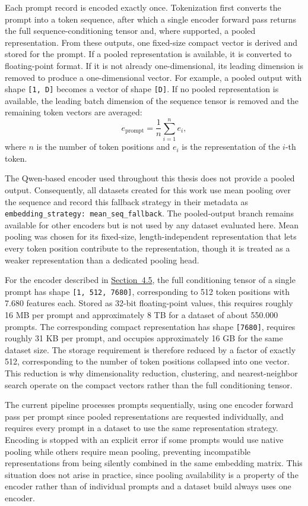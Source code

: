 Each prompt record is encoded exactly once. Tokenization first converts the prompt into a token sequence, after which a single encoder forward pass returns the full sequence-conditioning tensor and, where supported, a pooled representation. From these outputs, one fixed-size compact vector is derived and stored for the prompt. If a pooled representation is available, it is converted to floating-point format. If it is not already one-dimensional, its leading dimension is removed to produce a one-dimensional vector. For example, a pooled output with shape \texttt{[1, D]} becomes a vector of shape \texttt{[D]}. If no pooled representation is available, the leading batch dimension of the sequence tensor is removed and the remaining token vectors are averaged:
\[
e_{\text{prompt}} = \frac{1}{n} \sum_{i=1}^{n} e_i,
\]
where $n$ is the number of token positions and $e_i$ is the representation of the $i$-th token.

The Qwen-based encoder used throughout this thesis does not provide a pooled output. Consequently, all datasets created for this work use mean pooling over the sequence and record this fallback strategy in their metadata as \texttt{embedding\_strategy: mean\_seq\_fallback}. The pooled-output branch remains available for other encoders but is not used by any dataset evaluated here. Mean pooling was chosen for its fixed-size, length-independent representation that lets every token position contribute to the representation, though it is treated as a weaker representation than a dedicated pooling head.

For the encoder described in \hyperref[sec:4.5]{Section~4.5}, the full conditioning tensor of a single prompt has shape \texttt{[1, 512, 7680]}, corresponding to 512 token positions with 7.680 features each. Stored as 32-bit floating-point values, this requires roughly 16 MB per prompt and approximately 8 TB for a dataset of about 550.000 prompts. The corresponding compact representation has shape \texttt{[7680]}, requires roughly 31 KB per prompt, and occupies approximately 16 GB for the same dataset size. The storage requirement is therefore reduced by a factor of exactly 512, corresponding to the number of token positions collapsed into one vector. This reduction is why dimensionality reduction, clustering, and nearest-neighbor search operate on the compact vectors rather than the full conditioning tensor.

The current pipeline processes prompts sequentially, using one encoder forward pass per prompt since pooled representations are requested individually, and requires every prompt in a dataset to use the same representation strategy. Encoding is stopped with an explicit error if some prompts would use native pooling while others require mean pooling, preventing incompatible representations from being silently combined in the same embedding matrix. This situation does not arise in practice, since pooling availability is a property of the encoder rather than of individual prompts and a dataset build always uses one encoder.

